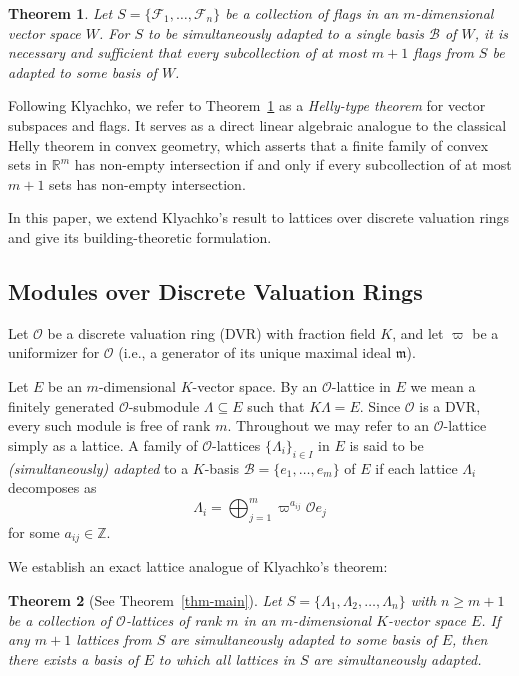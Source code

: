 \documentclass[12pt]{amsart}
\newtheorem{theorem}{Theorem}[section]
\theoremstyle{definition}
\theoremstyle{remark}
\begin{document}
\begin{theorem}
\label{thm:klyachko-helly-flags}
Let $S = \{\mathcal{F}_1, \dots, \mathcal{F}_n\}$ be a collection of flags in an $m$-dimensional vector space $W$. For $S$ to be simultaneously adapted to a single basis $\mathcal{B}$ of $W$, it is necessary and sufficient that every subcollection of at most $m+1$ flags from $S$ be adapted to some basis of $W$.
\end{theorem}

Following Klyachko, we refer to Theorem~\ref{thm:klyachko-helly-flags} as a \textit{Helly-type theorem} for vector subspaces and flags. It serves as a direct linear algebraic analogue to the classical Helly theorem in convex geometry, which asserts that a finite family of convex sets in $\mathbb{R}^m$ has non-empty intersection if and only if every subcollection of at most $m+1$ sets has non-empty intersection.

In this paper, we extend Klyachko's result to lattices over discrete valuation rings and give its %
building-theoretic formulation.

\subsection*{Modules over Discrete Valuation Rings}
Let $\mathcal{O}$ be a discrete valuation ring (DVR) with fraction field $K$, and let $\varpi$ be a uniformizer for $\mathcal{O}$ (i.e., a generator of its unique maximal ideal $\mathfrak{m}$). 

Let $E$ be an $m$-dimensional $K$-vector space. By an $\mathcal O$-lattice in $E$ we mean a finitely generated
$\mathcal O$-submodule $\Lambda\subseteq E$ such that $K\Lambda=E$. Since $\mathcal O$ is a DVR, every such module is free of rank $m$.  Throughout we may refer to an $\mathcal{O}$-lattice simply as a lattice. A family of $\mathcal{O}$-lattices $\{\Lambda_i\}_{i \in I}$ in $E$ is said to be \textit{(simultaneously) adapted} to a $K$-basis $\mathcal{B} = \{e_1, \dots, e_m\}$ of $E$ if each lattice $\Lambda_i$ decomposes as
\[
  \Lambda_i = \bigoplus_{j=1}^m \varpi^{a_{ij}} \mathcal{O} e_j
\]
for some $a_{ij} \in \mathbb{Z}$.

We establish an exact lattice analogue of Klyachko's theorem:

\begin{theorem}[See Theorem~\ref{thm-main}]
\label{thm:lattice-helly-intro}
Let $S = \{\Lambda_1, \Lambda_2, \dots, \Lambda_n\}$ with $n \ge m+1$ be a collection of $\mathcal{O}$-lattices of rank $m$ in an $m$-dimensional $K$-vector space $E$. If any $m+1$ lattices from $S$ are simultaneously adapted to some basis of $E$, then there exists a basis of $E$ to which all lattices in $S$ are simultaneously adapted.
\end{theorem}
\end{document}
